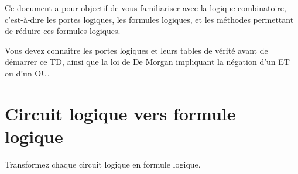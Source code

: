 \documentclass[11pt,a4paper]{article}
\begin{document}
\EncadreTitre

\bigskip


%
%

\bigskip


Ce document a pour objectif de vous familiariser avec la logique combinatoire, c'est-à-dire les portes logiques, les formules logiques, et les méthodes permettant de réduire ces formules logiques.

\bigskip

Vous devez connaître les portes logiques et leurs tables de vérité avant de démarrer ce TD, ainsi que la loi de De Morgan impliquant la négation d'un ET ou d'un OU.



\section{Circuit logique vers formule logique}

\medskip

Transformez chaque circuit logique en formule logique.

\end{document}
